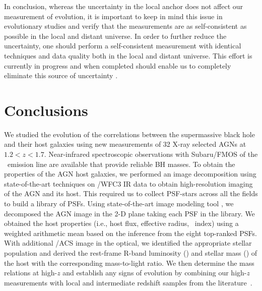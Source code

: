\documentclass[apj]{emulateapj}
\begin{document}
In conclusion, whereas the uncertainty in the local anchor does not affect our measurement of evolution, it is important to keep in mind this issue in evolutionary studies and verify that the measurements are as self-consistent as possible in the local and distant universe. In order to further reduce the uncertainty, one should perform a self-consistent measurement with identical techniques and data quality both in the local and distant universe. This effort is currently in progress and when completed should enable us to completely eliminate this source of uncertainty \citep{Bennert11,Harris2012, Bennert2015}.


\section{Conclusions} \label{sec:sum}

We studied the evolution of the correlations between the supermassive black hole and their host galaxies using new measurements of 32 X-ray selected AGNs at $1.2<z<1.7$. Near-infrared spectroscopic observations with Subaru/FMOS of the \halpha\ emission line are available that provide reliable BH masses. To obtain the properties of the AGN host galaxies, we performed an image decomposition using state-of-the-art techniques on \hst/WFC3 IR data to obtain high-resolution imaging of the AGN and its host. This required us to collect PSF-stars across all the fields to build a library of PSFs. Using state-of-the-art image modeling tool \lenstronomy, we decomposed the AGN image in the 2-D plane taking each PSF in the library. We obtained the host properties (i.e., host flux, effective radius, \sersic\ index) using a weighted arithmetic mean based on the inference from the eight top-ranked PSFs. With additional \hst/ACS image in the optical, we identified the appropriate stellar population and derived the rest-frame R-band luminosity (\lhost) and stellar mass (\smass) of the host with the corresponding mass-to-light ratio.
We then determine the mass relations at high-$z$ and establish any signs of evolution by combining our high-$z$ measurements with local and intermediate redshift samples from the literature~\citep{Park15, Bennert11, SS13, Cisternas2011}. 
\end{document}
